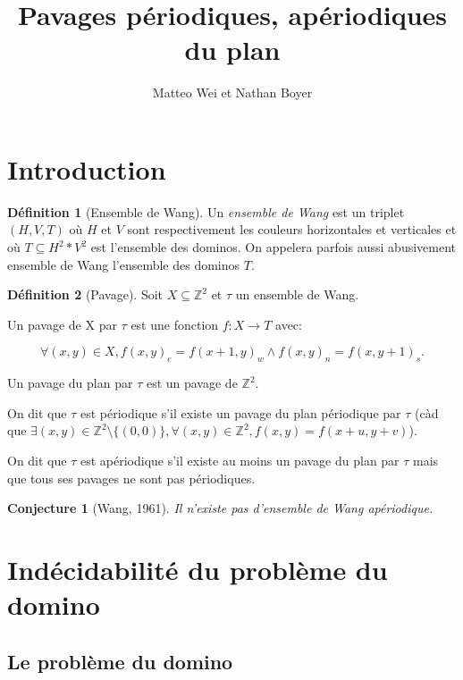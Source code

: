 \documentclass{scrartcl}
\title{Pavages périodiques, apériodiques du plan}
\author{Matteo Wei et Nathan Boyer}
\newcommand{\Z}{\mathbb Z}
\newcommand{\sube}{\subseteq}
\newtheorem{conjecture}{Conjecture}
\theoremstyle{definition}
\newtheorem{definition}{Définition}
\theoremstyle{remark}
\begin{document}
\maketitle

\section{Introduction}

\begin{definition}[Ensemble de Wang]
    
Un \emph{ensemble de Wang} est un triplet $(H,V,T)$ où $H$ et $V$ sont respectivement les couleurs horizontales et verticales
et où $T \sube H^2 * V^2$ est l'ensemble des dominos. On appelera parfois aussi abusivement ensemble de Wang l'ensemble des dominos $T$.

\end{definition}

\begin{definition}[Pavage]

Soit $X \sube \Z^2$ et $\tau$ un ensemble de Wang.

Un pavage de X par $\tau$ est une fonction $f:X \to T$ avec:

\[\forall (x,y) \in X, {f(x,y)}_e = {f(x+1,y)}_w \land {f(x,y)}_n = {f(x,y+1)}_s.\]

Un pavage du plan par $\tau$ est un pavage de $\Z^2$.

On dit que $\tau$ est périodique s'il existe un pavage du plan périodique par $\tau$
(càd que $\exists (x,y) \in \Z^2 \setminus \{(0,0)\}, \forall (x,y) \in \Z^2, f(x,y) = f(x+u,y+v)$).

On dit que $\tau$ est apériodique s'il existe au moins un pavage du plan par $\tau$ mais que tous ses pavages ne sont pas périodiques.

\begin{conjecture}[Wang, 1961]
  Il n'existe pas d'ensemble de Wang apériodique.
\end{conjecture}
    
\end{definition}



\section{Indécidabilité du problème du domino}

\subsection{Le problème du domino}
\end{document}
